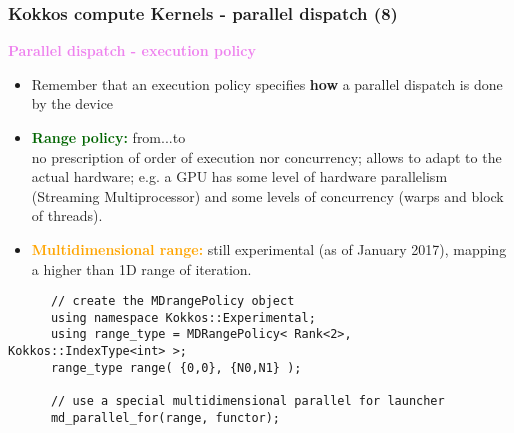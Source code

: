 \begin{frame}[fragile=singleslide]
  \frametitle{Kokkos compute Kernels - parallel dispatch (8)}
  
  {\Large \textcolor{violet}{\textbf{Parallel dispatch - execution policy}}}

  \begin{itemize}
  \item Remember that an execution policy specifies \textbf{how} a parallel dispatch is done by the device
  \item \textcolor{darkgreen}{\bf Range policy:} from...to\\
    no prescription of order of execution nor concurrency; allows to adapt to the actual hardware; e.g. a GPU has some level of hardware parallelism (Streaming Multiprocessor) and some levels of concurrency (warps and block of threads).
  \item \textcolor{orange}{\bf Multidimensional range:} still experimental (as of January 2017), mapping a higher than 1D range of iteration.
  \end{itemize}
  {\small
    \begin{verbatim}
      // create the MDrangePolicy object
      using namespace Kokkos::Experimental;
      using range_type = MDRangePolicy< Rank<2>, Kokkos::IndexType<int> >;
      range_type range( {0,0}, {N0,N1} );
      
      // use a special multidimensional parallel for launcher
      md_parallel_for(range, functor);
    \end{verbatim}
  }

\end{frame}

